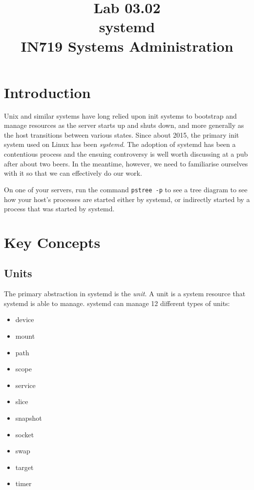 \documentclass{article}
\begin{document}
\title{Lab 03.02\\systemd\\IN719 Systems Administration}
\date{}
\maketitle

\section{Introduction}
Unix and similar systems have long relied upon init systems to bootstrap and manage resources as the server starts up and shuts down, and more generally as the host transitions between various states. Since about 2015, the primary init system used on Linux has been \emph{systemd}. The adoption of systemd has been a contentious process and the ensuing controversy is well worth discussing at a pub after about two beers. In the meantime, however, we need to familiarise ourselves with it so that we can effectively do our work.

On one of your servers, run the command \texttt{pstree -p} to see a tree diagram to see how your host's processes are started either by systemd, or indirectly started by a process that was started by systemd.

\section{Key Concepts}
\subsection*{Units}
The primary abstraction in systemd is the \emph{unit}. A unit is a system resource that systemd is able to manage. systemd can manage 12 different types of units:

\begin{itemize}
  \item device
  \item mount
  \item path
  \item scope
  \item service
  \item slice
  \item snapshot
  \item socket
  \item swap
  \item target
  \item timer
\end{itemize}
  
\end{document}
